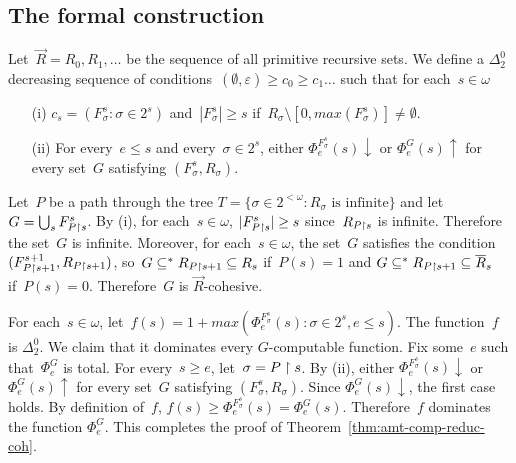 \subsection{The formal construction}

Let~$\vec{R} = R_0, R_1, \dots$ be the sequence of all primitive recursive sets.
We define a $\Delta^0_2$ decreasing sequence of conditions~$(\emptyset, \varepsilon) \geq c_0 \geq c_1 \dots$
such that for each~$s \in \omega$
\begin{itemize}
	\item[(i)] $c_s = (F^s_\sigma : \sigma \in 2^s)$ and~$|F^s_\sigma| \geq s$ if~$R_\sigma \setminus [0, max(F^s_\sigma)] \neq \emptyset$.
	\item[(ii)] For every~$e \leq s$ and every~$\sigma \in 2^s$, either $\Phi^{F^s_\sigma}_e(s) \downarrow$
	or $\Phi^G_e(s) \uparrow$ for every set~$G$ satisfying $(F^s_\sigma, R_\sigma)$.
\end{itemize}
Let~$P$ be a path through the tree $T = \{ \sigma \in 2^{<\omega} : R_\sigma \mbox{ is infinite} \}$
and let~$G = \bigcup_s F^s_{P \upharpoonright s}$. By (i), for each~$s \in \omega$, $|F^s_{P \upharpoonright s}| \geq s$
since~$R_{P \upharpoonright s}$ is infinite. Therefore the set~$G$ is infinite.
Moreover, for each~$s \in \omega$, the set~$G$ satisfies the condition~$(F^{s+1}_{P \upharpoonright s+1}, R_{P \upharpoonright s+1})$,
so~$G \subseteq^{*} R_{P \upharpoonright s+1} \subseteq R_s$ if~$P(s) = 1$ and
$G \subseteq^{*} R_{P \upharpoonright s+1} \subseteq \overline{R}_s$ if~$P(s) = 0$. 
Therefore~$G$ is $\vec{R}$-cohesive.

For each~$s \in \omega$, let~$f(s) = 1 + max(\Phi^{F^s_\sigma}_e(s) : \sigma \in 2^s, e \leq s)$.
The function~$f$ is $\Delta^0_2$. We claim that it dominates every $G$-computable function.
Fix some~$e$ such that~$\Phi^G_e$ is total. For every~$s \geq e$, let~$\sigma = P \upharpoonright s$. By (ii), either
$\Phi^{F^s_\sigma}_e(s) \downarrow$ or $\Phi^G_e(s) \uparrow$ for every
set~$G$ satisfying $(F^s_\sigma, R_\sigma)$. Since $\Phi^G_e(s) \downarrow$,
the first case holds. By definition of~$f$, $f(s) \geq \Phi^{F^s_\sigma}_e(s) = \Phi^G_e(s)$.
Therefore~$f$ dominates the function $\Phi^G_e$. This completes the proof of Theorem~\ref{thm:amt-comp-reduc-coh}.




